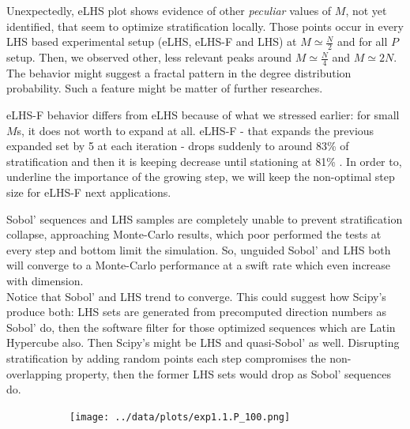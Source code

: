 \documentclass[12pt]{extarticle}
\newcommand{\midcaption}[1]{
    \captionsetup{justification=centering}
    \caption{#1}
}
\begin{document}
Unexpectedly, eLHS plot shows evidence of other \textit{peculiar} values of $M$, not yet identified, that seem to optimize stratification locally. Those points occur in every LHS based experimental setup (eLHS, eLHS-F and LHS) at $M \simeq \frac{N}{2}$ and for all $P$ setup. Then, we observed other, less relevant peaks around $M \simeq \frac{N}{4}$ and $M \simeq 2N$. The behavior might suggest a fractal pattern in the degree distribution probability. Such a feature might be matter of further researches.

eLHS-F behavior differs from eLHS because of what we stressed earlier: for small $M$s, it does not worth to expand at all. eLHS-F - that expands the previous expanded set by 5 at each iteration - drops suddenly to around 83\% of stratification and then it is keeping decrease until stationing at 81\% . In order to, underline the importance of the growing step, we will keep the non-optimal step size for eLHS-F next applications.

Sobol' sequences and LHS samples are completely unable to prevent stratification collapse, approaching Monte-Carlo results, which poor performed the tests at every step and bottom limit the simulation. So, unguided Sobol' and LHS both will converge to a Monte-Carlo performance at a swift rate which even increase with dimension. \\ 
Notice that Sobol' and LHS trend to converge. This could suggest how Scipy's produce both: LHS sets are generated from precomputed direction numbers as Sobol' do, then the software filter for those optimized sequences which are Latin Hypercube also. Then Scipy's might be LHS and quasi-Sobol' as well. Disrupting stratification by adding random points each step compromises the non-overlapping property, then the former LHS sets would drop as Sobol' sequences do.


\begin{figure}[H]
    \centering
    \begin{subfigure}[a]{1\textwidth}
        \centering
    \end{subfigure}
    \begin{subfigure}[b]{1\textwidth}
        \centering
    \end{subfigure}
\end{figure}
\begin{figure}  
    \begin{subfigure}[c]{1\textwidth}
        \centering
        \texttt{[image: ../data/plots/exp1.1.P\_100.png]}
    \end{subfigure}
    \midcaption{}
    \label{fig:exp1}
\end{figure}
\end{document}
